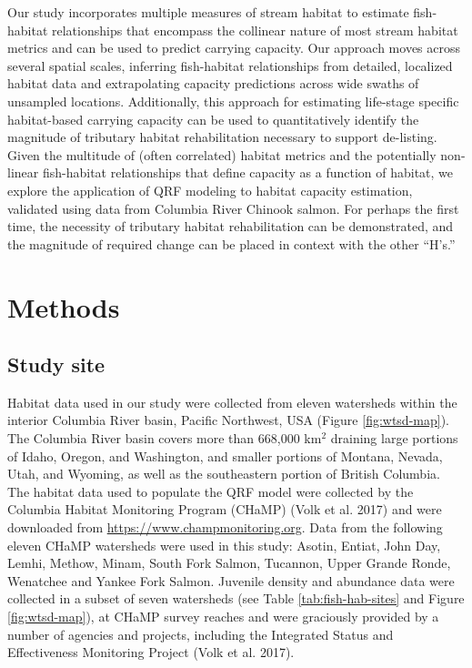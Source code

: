 \documentclass[
  12pt,
]{article}
\begin{document}
Our study incorporates multiple measures of stream habitat to estimate fish-habitat relationships that encompass the collinear nature of most stream habitat metrics and can be used to predict carrying capacity. Our approach moves across several spatial scales, inferring fish-habitat relationships from detailed, localized habitat data and extrapolating capacity predictions across wide swaths of unsampled locations. Additionally, this approach for estimating life-stage specific habitat-based carrying capacity can be used to quantitatively identify the magnitude of tributary habitat rehabilitation necessary to support de-listing. Given the multitude of (often correlated) habitat metrics and the potentially non-linear fish-habitat relationships that define capacity as a function of habitat, we explore the application of QRF modeling to habitat capacity estimation, validated using data from Columbia River Chinook salmon. For perhaps the first time, the necessity of tributary habitat rehabilitation can be demonstrated, and the magnitude of required change can be placed in context with the other ``H's.''

\hypertarget{methods}{%
\section{Methods}\label{methods}}

\hypertarget{study-site}{%
\subsection{Study site}\label{study-site}}

Habitat data used in our study were collected from eleven watersheds within the interior Columbia River basin, Pacific Northwest, USA (Figure \ref{fig:wtsd-map}). The Columbia River basin covers more than 668,000 km\(^2\) draining large portions of Idaho, Oregon, and Washington, and smaller portions of Montana, Nevada, Utah, and Wyoming, as well as the southeastern portion of British Columbia. The habitat data used to populate the QRF model were collected by the Columbia Habitat Monitoring Program (CHaMP) (Volk et al. 2017) and were downloaded from \url{https://www.champmonitoring.org}. Data from the following eleven CHaMP watersheds were used in this study: Asotin, Entiat, John Day, Lemhi, Methow, Minam, South Fork Salmon, Tucannon, Upper Grande Ronde, Wenatchee and Yankee Fork Salmon. Juvenile density and abundance data were collected in a subset of seven watersheds (see Table \ref{tab:fish-hab-sites} and Figure \ref{fig:wtsd-map}), at CHaMP survey reaches and were graciously provided by a number of agencies and projects, including the Integrated Status and Effectiveness Monitoring Project (Volk et al. 2017).
\end{document}
